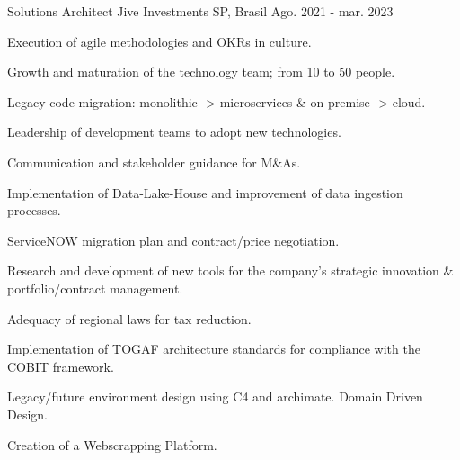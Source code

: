 

\begin{cventries}


   	\cventry
	{Solutions Architect} %
	{Jive Investments} %
	{SP, Brasil} %
	{Ago. 2021 - mar. 2023} %
	{
		\begin{cvitems} %
			\item {Execution of agile methodologies and OKRs in culture.}
			\item {Growth and maturation of the technology team; from 10 to 50 people.}
			\item {Legacy code migration: monolithic -> microservices \& on-premise -> cloud.}
			\item {Leadership of development teams to adopt new technologies.}			
			\item {Communication and stakeholder guidance for M\&As.}			
			\item {Implementation of Data-Lake-House and improvement of data ingestion processes.}
			\item {ServiceNOW migration plan and contract/price negotiation.}
			\item {Research and development of new tools for the company's strategic innovation \& portfolio/contract management. }
			\item {Adequacy of regional laws for tax reduction.}			
			\item {Implementation of TOGAF architecture standards for compliance with the COBIT framework.}
			\item {Legacy/future environment design using C4 and archimate. Domain Driven Design.}
			\item {Creation of a Webscrapping Platform.}					
		\end{cvitems}
	}
 

\end{cventries}
